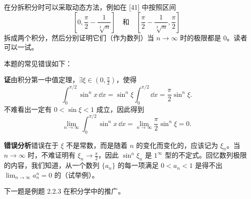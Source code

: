 \begin{xremark}
在分拆积分时可以采取动态方法，例如在 [41] 中按照区间
\[
  \left[0,\frac\pi2-\frac1{\sqrt[3]{n}}\right]
  \quad\text{和}\quad
  \left[\frac\pi2-\frac1{\sqrt[3]{n}},\frac\pi2\right]
\]
拆成两个积分，然后分别证明它们（作为数列）当 $n\to\infty$ 时的极限都是 0。读者可以一试。
\end{xremark}

\begin{xremark}
本题的常见错误如下：

\textbf{证}\quad 由积分第一中值定理，$\exists\xi\in(0,\frac\pi2)$，使得
\[
  \int_0^{\pi/2}\sin^n x\,\dd x
  =\sin^n\xi\int_0^{\pi/2}\dd x
  =\frac\pi2\sin^n\xi.
\]
不难看出一定有 $0<\sin\xi<1$ 成立，因此得到
\[
  \lim_{n\to\infty}\int_0^{\pi/2}\sin^n x\,\dd x
  =\lim_{n\to\infty}\frac\pi2\sin^n\xi=0.
\]

\textbf{错误分析}\quad 错误在于 $\xi$ 不是常数，而是随着 $n$ 的变化而变化的，应该记为 $\xi_n$。当 $n\to\infty$ 时，不难证明有 $\xi_n\to\frac\pi2$，因此 $\sin^n\xi_n$ 是 $1^\infty$ 型的不定式。回忆数列极限的内容，我们知道，从一个数列 $\{a_n\}$ 的每一项满足 $0<a_n<1$ 是得不出 $\lim_{n\to\infty}a_n^n=0$ 的（试举例）。
\end{xremark}

下一题是例题 2.2.3 在积分学中的推广。

